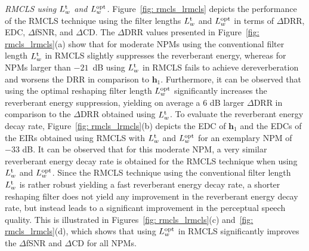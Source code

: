 \documentclass[twocolumn]{bmcart}%
\begin{document}
\emph{RMCLS using $L^{\rm t}_w$ and $L_w^{\rm opt}$.} \enspace Figure~\ref{fig: rmcls_lrmcls} depicts the performance of the RMCLS technique using the filter lengths $L^{\rm t}_w$ and $L_w^{\rm opt}$ in terms of $\Delta$DRR, EDC, $\Delta$fSNR, and $\Delta$CD.
The $\Delta$DRR values presented in Figure~\ref{fig: rmcls_lrmcls}(a) show that for moderate NPMs using the conventional filter length $L^{\rm t}_w$ in RMCLS slightly suppresses the reverberant energy, whereas for NPMs larger than $-21$~dB using $L^{\rm t}_w$ in RMCLS fails to achieve dereverberation and worsens the DRR in comparison to $\mathbf{h}_1$.
Furthermore, it can be observed that using the optimal reshaping filter length $L^{\rm opt}_w$ significantly increases the reverberant energy suppression, yielding on average a $6$ dB larger $\Delta$DRR in comparison to the $\Delta$DRR obtained using $L^{\rm t}_w$.
To evaluate the reverberant energy decay rate, Figure~\ref{fig: rmcls_lrmcls}(b) depicts the EDC of $\mathbf{h}_1$ and the EDCs of the EIRs obtained using RMCLS with $L^{\rm t}_w$ and $L^{\rm opt}_w$ for an exemplary NPM of $-33$ dB.
It can be observed that for this moderate NPM, a very similar reverberant energy decay rate is obtained for the RMCLS technique when using $L^{\rm t}_w$ and $L^{\rm opt}_w$. 
Since the RMCLS technique using the conventional filter length $L^{\rm t}_w$ is rather robust yielding a fast reverberant energy decay rate, a shorter reshaping filter does not yield any improvement in the reverberant energy decay rate, but instead leads to a significant improvement in the perceptual speech quality.
This is illustrated in Figures~\ref{fig: rmcls_lrmcls}(c) and~\ref{fig: rmcls_lrmcls}(d), which shows that using $L^{\rm opt}_w$ in RMCLS significantly improves the $\Delta$fSNR and $\Delta$CD for all NPMs.
\end{document}

